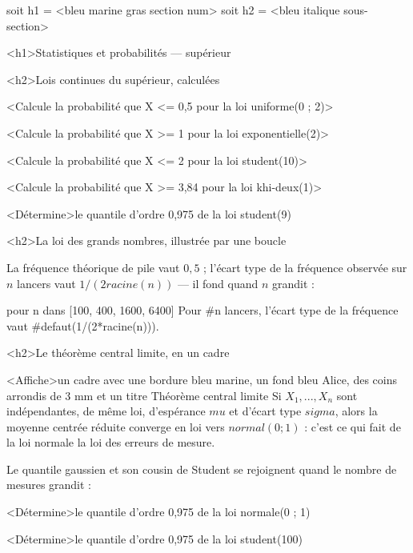 \documentclass[marges=20, taille=11, precision=3]{texecole}
\begin{document}
soit h1 = <bleu marine gras section num>
soit h2 = <bleu italique sous-section>

<h1>Statistiques et probabilités — supérieur


<h2>Lois continues du supérieur, calculées

<Calcule la probabilité que X <= 0,5 pour la loi uniforme(0 ; 2)>

<Calcule la probabilité que X >= 1 pour la loi exponentielle(2)>

<Calcule la probabilité que X <= 2 pour la loi student(10)>

<Calcule la probabilité que X >= 3,84 pour la loi khi-deux(1)>

<Détermine>le quantile d'ordre 0,975 de la loi student(9)

<h2>La loi des grands nombres, illustrée par une boucle

La fréquence théorique de pile vaut $0,5$ ; l'écart type de la fréquence observée sur $n$ lancers vaut $1/(2 racine(n))$ — il fond quand $n$ grandit :

pour n dans [100, 400, 1600, 6400] {
	Pour #n lancers, l'écart type de la fréquence vaut #{defaut(1/(2*racine(n)))}.
}

<h2>Le théorème central limite, en un cadre

<Affiche>un cadre avec une bordure bleu marine, un fond bleu Alice, des coins arrondis de 3 mm et un titre {Théorème central limite} {
	Si $X_1, ..., X_n$ sont indépendantes, de même loi, d'espérance
	$mu$ et d'écart type $sigma$, alors la moyenne centrée réduite
	converge en loi vers $normal(0; 1)$ : c'est ce qui fait de la loi
	normale la loi des erreurs de mesure.
}

Le quantile gaussien et son cousin de Student se rejoignent quand le nombre de mesures grandit :

<Détermine>le quantile d'ordre 0,975 de la loi normale(0 ; 1)

<Détermine>le quantile d'ordre 0,975 de la loi student(100)
\end{document}
